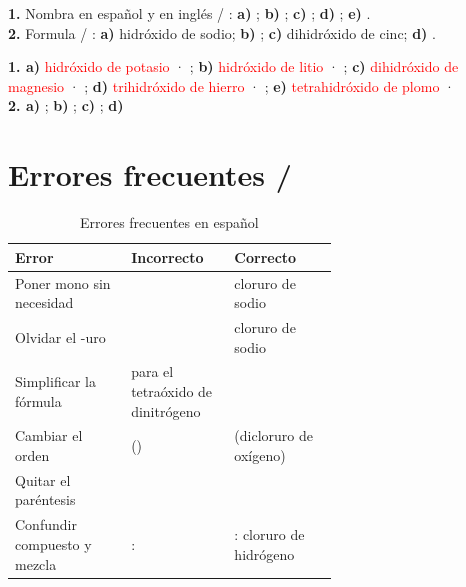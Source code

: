 \begin{exercise}
    \textbf{1.} Nombra en español y en inglés / : \textbf{a)} ; \textbf{b)} ; \textbf{c)} ; \textbf{d)} ; \textbf{e)} .\\
    \textbf{2.} Formula / : \textbf{a)} hidróxido de sodio; \textbf{b)} ; \textbf{c)} dihidróxido de cinc; \textbf{d)} .
    \begin{solu}
        \textbf{1. a)} \textcolor{red}{hidróxido de potasio} · \textcolor{red}{}; \textbf{b)} \textcolor{red}{hidróxido de litio} · \textcolor{red}{}; \textbf{c)} \textcolor{red}{dihidróxido de magnesio} · \textcolor{red}{}; \textbf{d)} \textcolor{red}{trihidróxido de hierro} · \textcolor{red}{}; \textbf{e)} \textcolor{red}{tetrahidróxido de plomo} · \textcolor{red}{}\\
        \textbf{2. a)} \textcolor{red}{}; \textbf{b)} \textcolor{red}{}; \textbf{c)} \textcolor{red}{}; \textbf{d)} \textcolor{red}{}
    \end{solu}
\end{exercise}

\section{Errores frecuentes / }

\begin{table}[H]
    \centering
    \caption{Errores frecuentes en español}
    \vspace{-5pt}
    \begin{tabular}{@{}l L{0.32\linewidth} L{0.32\linewidth}@{}}
        \toprule
        \textbf{Error} & \textbf{Incorrecto} & \textbf{Correcto} \\
        \midrule
        Poner mono sin necesidad &  & cloruro de sodio \\[3pt]
        Olvidar el -uro &  & cloruro de sodio \\[3pt]
        Simplificar la fórmula &  para el tetraóxido de dinitrógeno &  \\[3pt]
        Cambiar el orden &  () &  (dicloruro de oxígeno) \\[3pt]
        Quitar el paréntesis &  &  \\[3pt]
        Confundir compuesto y mezcla & :  & : cloruro de hidrógeno \\
        \bottomrule
    \end{tabular}
    \label{tab:u4_errores_es}
\end{table}

